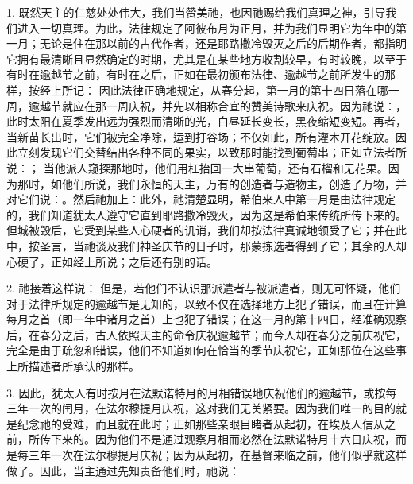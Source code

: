 1. 既然天主的仁慈处处伟大，我们当赞美祂，也因祂赐给我们真理之神，引导我们进入一切真理。为此，法律规定了阿彼布月为正月，并为我们显明它为年中的第一月；无论是住在那以前的古代作者，还是耶路撒冷毁灭之后的后期作者，都指明它拥有最清晰且显然确定的时期，尤其是在某些地方收割较早，有时较晚，以至于有时在逾越节之前，有时在之后，正如在最初颁布法律、逾越节之前所发生的那样，按经上所记： 因此法律正确地规定，从春分起，第一月的第十四日落在哪一周，逾越节就应在那一周庆祝，并先以相称合宜的赞美诗歌来庆祝。因为祂说：， 此时太阳在夏季发出远为强烈而清晰的光，白昼延长变长，黑夜缩短变短。再者，当新苗长出时，它们被完全净除，运到打谷场；不仅如此，所有灌木开花绽放。因此立刻发现它们交替结出各种不同的果实，以致那时能找到葡萄串；正如立法者所说：； 当他派人窥探那地时，他们用杠抬回一大串葡萄，还有石榴和无花果。因为那时，如他们所说，我们永恒的天主，万有的创造者与造物主，创造了万物，并对它们说：。然后祂加上：此外，祂清楚显明，希伯来人中第一月是由法律规定的，我们知道犹太人遵守它直到耶路撒冷毁灭，因为这是希伯来传统所传下来的。但城被毁后，它受到某些人心硬者的讥诮，我们却按法律真诚地领受了它；并在此中，按圣言，当祂谈及我们神圣庆节的日子时，那蒙拣选者得到了它；其余的人却心硬了，正如经上所说；之后还有别的话。\par

2. 祂接着这样说：  但是，若他们不认识那派遣者与被派遣者，则无可怀疑，他们对于法律所规定的逾越节是无知的，以致不仅在选择地方上犯了错误，而且在计算每月之首（即一年中诸月之首）上也犯了错误；在这一月的第十四日，经准确观察后，在春分之后，古人依照天主的命令庆祝逾越节；而今人却在春分之前庆祝它，完全是由于疏忽和错误，他们不知道如何在恰当的季节庆祝它，正如那位在这些事上所描述者所承认的那样。\par

3. 因此，犹太人有时按月在法默诺特月的月相错误地庆祝他们的逾越节，或按每三年一次的闰月，在法尔穆提月庆祝，这对我们无关紧要。因为我们唯一的目的就是纪念祂的受难，而且就在此时；正如那些亲眼目睹者从起初，在埃及人信从之前，所传下来的。因为他们不是通过观察月相而必然在法默诺特月十六日庆祝，而是每三年一次在法尔穆提月庆祝；因为从起初，在基督来临之前，他们似乎就这样做了。因此，当主通过先知责备他们时，祂说：\par

